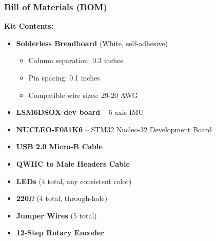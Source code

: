 \documentclass{beamer}
\begin{document}
\begin{frame}
    \frametitle{Bill of Materials (BOM)}
    \textbf{Kit Contents:}
    \begin{itemize}
        \item \textbf{Solderless Breadboard} (White, self-adhesive)
            \begin{itemize}
                \item Column separation: 0.3 inches
                \item Pin spacing: 0.1 inches
                \item Compatible wire sizes: 29-20 AWG
            \end{itemize}
        \item \textbf{LSM6DSOX dev board} – 6-axis IMU
        \item \textbf{NUCLEO-F031K6} – STM32 Nucleo-32 Development Board
        \item \textbf{USB 2.0 Micro-B Cable}
        \item \textbf{QWIIC to Male Headers Cable}
        \item \textbf{LEDs} (4 total, any consistent color)
        \item \textbf{220$\Omega$} (4 total, through-hole)
        \item \textbf{Jumper Wires} (5 total)
        \item \textbf{12-Step Rotary Encoder}
    \end{itemize}
\end{frame}
\end{document}
